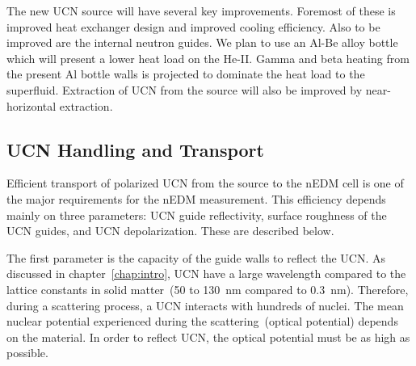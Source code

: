 The new UCN source will have several key improvements. Foremost of
these is improved heat exchanger design and improved cooling
efficiency. Also to be improved are the internal neutron guides. We
plan to use an Al-Be alloy bottle which will present a lower heat load
on the He-II. Gamma and beta heating from the present Al bottle walls
is projected to dominate the heat load to the superfluid. Extraction
of UCN from the source will also be improved by near-horizontal
extraction.





\subsection{UCN Handling and Transport}

Efficient transport of polarized UCN from the source to the nEDM cell
is one of the major requirements for the nEDM measurement. This
efficiency depends mainly on three parameters: UCN guide reflectivity,
surface roughness of the UCN guides, and UCN depolarization. These are
described below.

The first parameter is the capacity of the guide walls to reflect the
UCN. As discussed in chapter~\ref{chap:intro}, UCN have a large
wavelength compared to the lattice constants in solid matter~(50 to
130~nm compared to 0.3~nm). Therefore, during a scattering process, a
UCN interacts with hundreds of nuclei. The mean nuclear potential
experienced during the scattering~(optical potential) depends on the
material. In order to reflect UCN, the optical potential must be as
high as possible.

